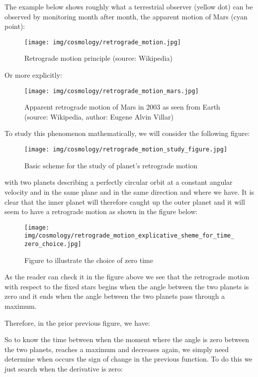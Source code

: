 	The example below shows roughly what a terrestrial observer (yellow dot) can be observed by monitoring month after month, the apparent motion of Mars (cyan point):
	\begin{figure}[H]
		\begin{center}
		\texttt{[image: img/cosmology/retrograde\_motion.jpg]}
		\end{center}	
		\caption{Retrograde motion principle (source: Wikipedia)}
	\end{figure}
	Or more explicitly:
	\begin{figure}[H]
		\begin{center}
		\texttt{[image: img/cosmology/retrograde\_motion\_mars.jpg]}
		\end{center}	
		\caption{Apparent retrograde motion of Mars in 2003 as seen from Earth (source: Wikipedia, author: Eugene Alvin Villar)}
	\end{figure}
	To study this phenomenon mathematically, we will consider the following figure:
	\begin{figure}[H]
		\begin{center}
		\texttt{[image: img/cosmology/retrograde\_motion\_study\_figure.jpg]}
		\end{center}	
		\caption{Basic scheme for the study of planet's retrograde motion}
	\end{figure}
	with two planets describing a perfectly circular orbit at a constant angular velocity and in the same plane and in the same direction and where we have. It is clear that the inner planet will therefore caught up the outer planet and it will seem to have a retrograde motion as shown in the figure below:
	\begin{figure}[H]
		\begin{center}
		\texttt{[image: img/cosmology/retrograde\_motion\_explicative\_sheme\_for\_time\_zero\_choice.jpg]}
		\end{center}	
		\caption[]{Figure to illustrate the choice of zero time}
	\end{figure}
	As the reader can check it in the figure above we see that the retrograde motion with respect to the fixed stars begins when the angle between the two planets is zero and it ends when the angle between the two planets pass through a maximum.

	Therefore, in the prior previous figure, we have:
	
	So to know the time between when the moment where the angle is zero between the two planets, reaches a maximum and decreases again, we simply need determine when occurs the sign of change in the previous function. To do this we just search when the derivative is zero:
	
